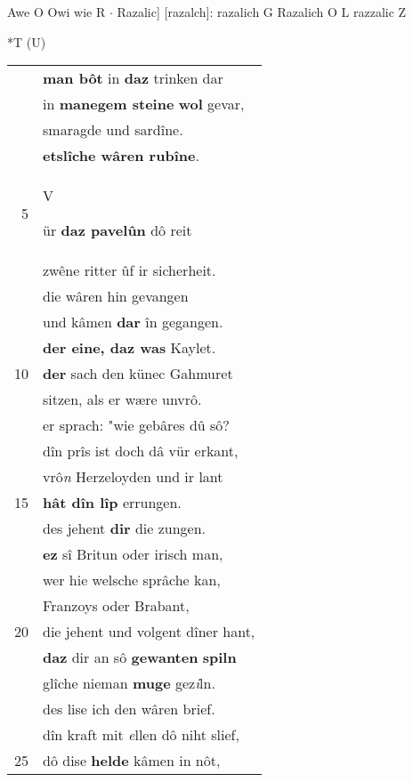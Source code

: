 \documentclass[8pt,a4paper,notitlepage]{article}
\begin{document}
\begin{table}[ht]
\begin{minipage}[t]{0.5\linewidth}
Awe O Owi wie R  $\cdot$ Razalic] [razalch]: razalich G Razalich O L razzalic Z \newline
\end{minipage}
\hspace{0.5cm}
\begin{minipage}[t]{0.5\linewidth}
\small
\begin{center}*T (U)
\end{center}
\begin{tabular}{rl}
 & \textbf{man bôt} in \textbf{daz} trinken dar\\ 
 & in \textbf{manegem steine} \textbf{wol} gevar,\\ 
 & smaragde und sardîne.\\ 
 & \textbf{etslîche wâren rubîne}.\\ 
5 & \begin{large}V\end{large}ür \textbf{daz pavelûn} dô reit\\ 
 & zwêne ritter ûf ir sicherheit.\\ 
 & die wâren hin gevangen\\ 
 & und kâmen \textbf{dar} în gegangen.\\ 
 & \textbf{der eine, daz was} Kaylet.\\ 
10 & \textbf{der} sach den künec Gahmuret\\ 
 & sitzen, als er wære unvrô.\\ 
 & er sprach: "wie gebâres dû sô?\\ 
 & dîn prîs ist doch dâ vür erkant,\\ 
 & vrô\textit{n} Herzeloyden und ir lant\\ 
15 & \textbf{hât dîn lîp} errungen.\\ 
 & des jehent \textbf{dir} die zungen.\\ 
 & \textbf{ez} sî Britun oder irisch man,\\ 
 & wer hie welsche sprâche kan,\\ 
 & Franzoys oder Brabant,\\ 
20 & die jehent und volgent dîner hant,\\ 
 & \textbf{daz} dir an sô \textbf{gewanten} \textbf{spiln}\\ 
 & glîche nieman \textbf{muge} gez\textit{i}ln.\\ 
 & des lise ich den wâren brief.\\ 
 & dîn kraft mit \textit{e}llen dô niht slief,\\ 
25 & dô dise \textbf{helde} kâmen in nôt,\\ 

\end{tabular}
\end{minipage}
\end{table}
\end{document}
